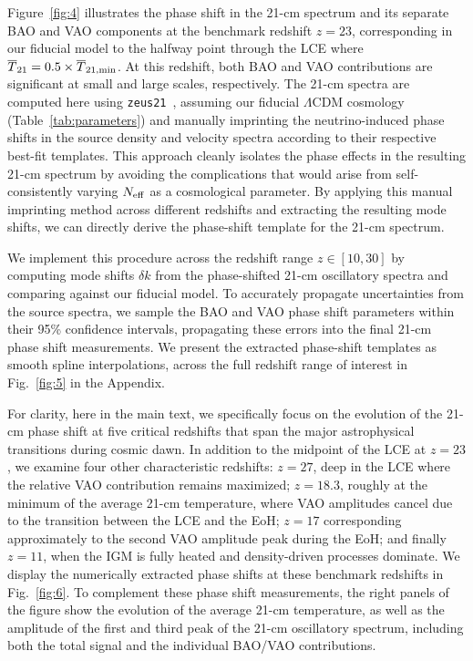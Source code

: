 \documentclass[floats,floatfix,showpacs,amssymb,prd,twocolumn,superscriptaddress,nofootinbib,reprint,preprintnumbers]{revtex4-2}
\begin{document}
Figure~\ref{fig:4} illustrates the phase shift in the 21-cm spectrum and its separate BAO and VAO components at the benchmark redshift $z=23$, corresponding in our fiducial model to the halfway point through the LCE where $\overline{T}_{21}= 0.5 \times \overline{T}_{21,\rm min}$. At this redshift, both BAO and VAO contributions are significant at small and large scales, respectively. The 21-cm spectra are computed here using \texttt{zeus21}~\cite{munoz23,munoz23b,Cruz:2024fsv}, assuming our fiducial $\Lambda$CDM cosmology (Table~\ref{tab:parameters}) and manually imprinting the neutrino-induced phase shifts in the source density and velocity spectra according to their respective best-fit templates. This approach cleanly isolates the phase effects in the resulting 21-cm spectrum by avoiding the complications that would arise from self-consistently varying $N_{\rm eff}$ as a cosmological parameter. By applying this manual imprinting method across different redshifts and extracting the resulting mode shifts, we can directly derive the phase-shift template for the 21-cm spectrum.

We implement this procedure across the redshift range $z \in [10,30]$ by computing mode shifts $\delta k$ from the phase-shifted 21-cm oscillatory spectra and comparing against our fiducial model. To accurately propagate uncertainties from the source spectra, we sample the BAO and VAO phase shift parameters within their 95\% confidence intervals, propagating these errors into the final 21-cm phase shift measurements. We present the extracted phase-shift templates as smooth spline interpolations, across the full redshift range of interest in Fig.~\ref{fig:5} in the Appendix.

For clarity, here in the main text, we specifically focus on the evolution of the 21-cm phase shift at five critical redshifts that span the major astrophysical transitions during cosmic dawn. In addition to the midpoint of the LCE at $z=23$, we examine four other characteristic redshifts: $z=27$, deep in the LCE where the relative VAO contribution remains maximized; $z=18.3$, roughly at the minimum of the average 21-cm temperature, where VAO amplitudes cancel due to the transition between the LCE and the EoH; $z=17$ corresponding approximately to the second VAO amplitude peak during the EoH; and finally $z=11$, when the IGM is fully heated and density-driven processes dominate. We display the numerically extracted phase shifts at these benchmark redshifts in Fig.~\ref{fig:6}. To complement these phase shift measurements, the right panels of the figure show the evolution of the average 21-cm temperature, as well as the amplitude of the first and third peak of the 21-cm oscillatory spectrum, including both the total signal and the individual BAO/VAO contributions.
\end{document}
